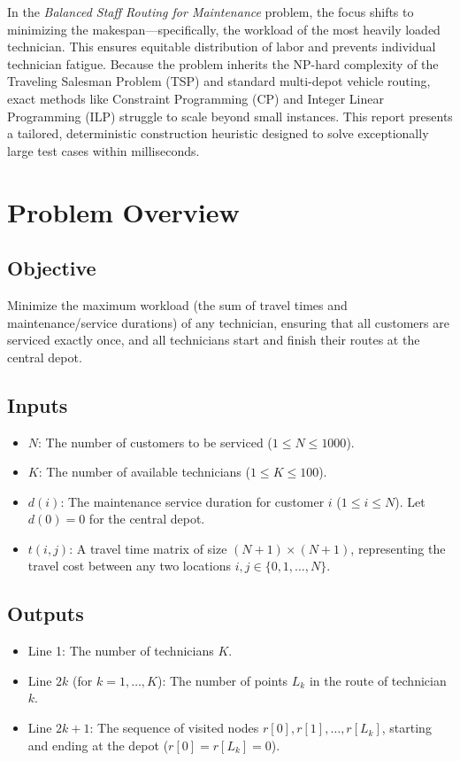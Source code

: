 \documentclass[11pt]{article}
\begin{document}
In the \textit{Balanced Staff Routing for Maintenance} problem, the focus shifts to minimizing the makespan—specifically, the workload of the most heavily loaded technician. This ensures equitable distribution of labor and prevents individual technician fatigue. Because the problem inherits the NP-hard complexity of the Traveling Salesman Problem (TSP) and standard multi-depot vehicle routing, exact methods like Constraint Programming (CP) and Integer Linear Programming (ILP) struggle to scale beyond small instances. This report presents a tailored, deterministic construction heuristic designed to solve exceptionally large test cases within milliseconds.

\section{Problem Overview}

\subsection{Objective}
Minimize the maximum workload (the sum of travel times and maintenance/service durations) of any technician, ensuring that all customers are serviced exactly once, and all technicians start and finish their routes at the central depot.

\subsection{Inputs}
\begin{itemize}
    \item \textbf{$N$}: The number of customers to be serviced ($1 \le N \le 1000$).
    \item \textbf{$K$}: The number of available technicians ($1 \le K \le 100$).
    \item \textbf{$d(i)$}: The maintenance service duration for customer $i$ ($1 \le i \le N$). Let $d(0) = 0$ for the central depot.
    \item \textbf{$t(i, j)$}: A travel time matrix of size $(N+1) \times (N+1)$, representing the travel cost between any two locations $i, j \in \{0, 1, \dots, N\}$.
\end{itemize}

\subsection{Outputs}
\begin{itemize}
    \item Line 1: The number of technicians $K$.
    \item Line $2k$ (for $k = 1, \dots, K$): The number of points $L_k$ in the route of technician $k$.
    \item Line $2k+1$: The sequence of visited nodes $r[0], r[1], \dots, r[L_k]$, starting and ending at the depot ($r[0] = r[L_k] = 0$).
\end{itemize}
\end{document}
